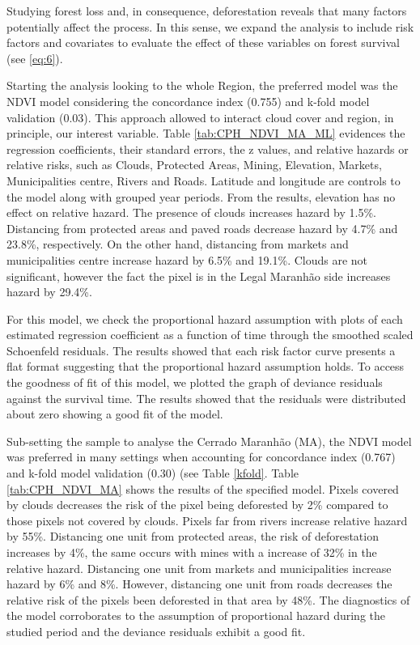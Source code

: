 Studying forest loss and, in consequence, deforestation reveals that many factors potentially affect the process. In this sense, we expand the analysis to include risk factors and covariates to evaluate the effect of these variables on forest survival (see \ref{eq:6}). 

Starting the analysis looking to the whole Region, the preferred model was the NDVI model considering the concordance index (0.755) and k-fold model validation (0.03). This approach allowed to interact cloud cover and region, in principle, our interest variable. Table \ref{tab:CPH_NDVI_MA_ML} evidences the regression coefficients, their standard errors, the z values, and relative hazards or relative risks, such as Clouds, Protected Areas, Mining, Elevation, Markets, Municipalities centre, Rivers and Roads. Latitude and longitude are controls to the model along with grouped year periods. From the results, elevation has no effect on relative hazard. The presence of clouds increases hazard by 1.5\%. Distancing from protected areas and paved roads decrease hazard by 4.7\% and 23.8\%, respectively. On the other hand, distancing from markets and municipalities centre increase hazard by 6.5\% and 19.1\%. Clouds are not significant, however the fact the pixel is in the Legal Maranhão side increases hazard by 29.4\%. 

For this model, we check the proportional hazard assumption with plots of each estimated regression coefficient as a function of time through the smoothed scaled Schoenfeld residuals. The results showed that each risk factor curve presents a flat format suggesting that the proportional hazard assumption holds. To access the goodness of fit of this model, we plotted the graph of deviance residuals against the survival time. The results showed that the residuals were distributed about zero showing a good fit of the model. 


Sub-setting the sample to analyse the Cerrado Maranhão (MA), the NDVI model was preferred in many settings when accounting for concordance index (0.767) and k-fold model validation (0.30) (see Table \ref{kfold}. Table \ref{tab:CPH_NDVI_MA} shows the results of the specified model. Pixels covered by clouds decreases the risk of the pixel being deforested by 2\% compared to those pixels not covered by clouds. Pixels far from rivers increase relative hazard by 55\%. Distancing one unit from protected areas, the risk of deforestation increases by 4\%, the same occurs with mines with a increase of 32\% in the relative hazard. Distancing one unit from markets and municipalities increase hazard by 6\% and 8\%. However, distancing one unit from roads decreases the relative risk of the pixels been deforested in that area by 48\%. The diagnostics of the model corroborates to the assumption of proportional hazard during the studied period and the deviance residuals exhibit a good fit. 


